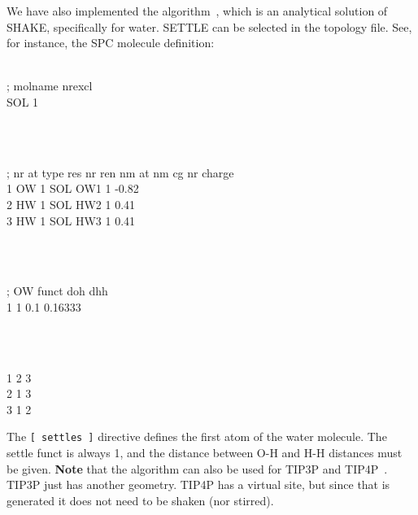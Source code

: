 We have also implemented the  algorithm~\cite{Miyamoto92},
which is an analytical solution of SHAKE, specifically for water. 
SETTLE can be selected in the topology file. See, for instance, the
SPC molecule definition:\\
\begin{tt}
[ moleculetype ]\\
; molname       nrexcl\\
SOL             1\\
\end{tt}\\
\begin{tt}
[ atoms ]\\
; nr    at type res nr  ren nm  at nm   cg nr   charge\\
1       OW      1       SOL     OW1     1       -0.82\\
2       HW      1       SOL     HW2     1        0.41\\
3       HW      1       SOL     HW3     1        0.41\\
\end{tt}\\
\begin{tt}
[ settles ]\\
; OW    funct   doh     dhh\\
1       1       0.1     0.16333\\
\end{tt}\\
\begin{tt}
[ exclusions ]\\
1       2       3\\
2       1       3\\
3       1       2\\
\end{tt}
The {\tt [ settles ]} directive defines the first atom of the water molecule.
The settle funct is always 1, and the distance between O-H and H-H distances
must be given. {\bf Note} that the algorithm can also be used
for TIP3P and TIP4P~\cite{Jorgensen83}.
TIP3P just has another geometry. TIP4P has a virtual site, but since 
that is generated it does not need to be shaken (nor stirred).


